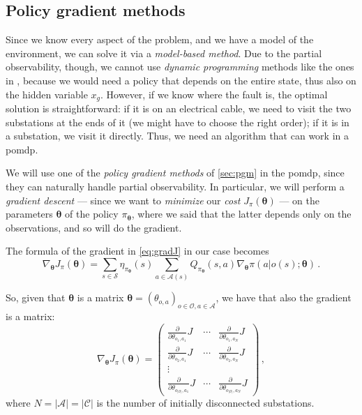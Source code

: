 \subsection{Policy gradient methods}

Since we know every aspect of the problem, and we have a model of the environment, we can solve it via a \emph{model-based method}. Due to the partial observability, though, we cannot use \emph{dynamic programming} methods like the ones in \cite{BellmanDP}, because we would need a policy that depends on the entire state, thus also on the hidden variable $x_g$. However, if we know where the fault is, the optimal solution is straightforward: if it is on an electrical cable, we need to visit the two substations at the ends of it (we might have to choose the right order); if it is in a substation, we visit it directly. Thus, we need an algorithm that can work in a \acrshort{pomdp}.

We will use one of the \emph{policy gradient methods} of \autoref{sec:pgm} in the \acrshort{pomdp}, since they can naturally handle partial observability. In particular, we will perform a \emph{gradient descent} --- since we want to \textit{minimize} our \textit{cost} $J_\pi(\boldsymbol \theta)$ --- on the parameters $\boldsymbol \theta$ of the policy $\pi_{\boldsymbol \theta}$, where we said that the latter depends only on the observations, and so will do the gradient.

The formula of the gradient in \eqref{eq:gradJ} in our case becomes
\begin{equation}
    \nabla_{\boldsymbol \theta} J_\pi (\boldsymbol \theta) = \sum_{s \in \mathcal S} \eta_{\pi_{\boldsymbol \theta}}(s) \sum_{a \in \mathcal A(s)} Q_{\pi_{\boldsymbol \theta}}(s,a) \nabla_{\boldsymbol \theta} \pi(a|o(s); \boldsymbol \theta) \, .
    \label{eq:mygradJ_oneline}
\end{equation}

So, given that $\boldsymbol \theta$ is a matrix $\boldsymbol \theta = (\theta_{o,a})_{o \in \mathcal O, a \in \mathcal A}$, we have that also the gradient is a matrix:
\begin{equation}
    \nabla_{\boldsymbol \theta} J_\pi (\boldsymbol \theta) = \begin{pmatrix}
        \frac{\partial}{\partial \theta_{o_1, a_1}} J & \cdots & \frac{\partial}{\partial \theta_{o_1, a_N}} J \\
        \frac{\partial}{\partial \theta_{o_2, a_1}} J &  \cdots & \frac{\partial}{\partial \theta_{o_2, a_N}} J \\
        \vdots \\
        \frac{\partial}{\partial \theta_{o_{|\mathcal O|}, a_1}} J & \cdots & \frac{\partial}{\partial \theta_{o_{|\mathcal O|}, a_N}} J
    \end{pmatrix} \, ,
\end{equation}
where $N = |\mathcal A| = |\mathcal C|$ is the number of initially disconnected substations.

